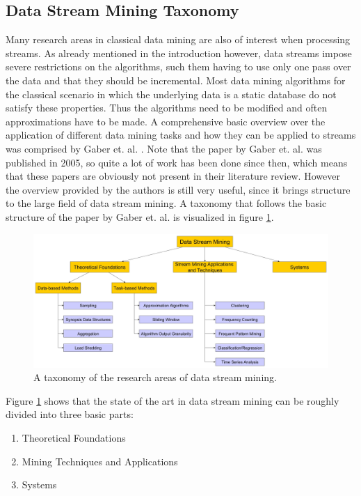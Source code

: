 \subsection{Data Stream Mining Taxonomy}
\label{subsec_dataStreamMiningTaxonomy}
Many research areas in classical data mining are also of interest when processing streams. As already mentioned in the introduction however, data streams impose severe restrictions on the algorithms, such them having to use only one pass over the data and that they should be incremental. Most data mining algorithms for the classical scenario in which the underlying data is a static database do not satisfy these properties. Thus the algorithms need to be modified and often approximations have to be made. A comprehensive basic overview over the application of different data mining tasks and how they can be applied to streams was comprised by Gaber et. al. \cite{gaber2005mining}. Note that the paper by Gaber et. al. was published in 2005, so quite a lot of work has been done since then, which means that these papers are obviously not present in their literature review. However the overview provided by the authors is still very useful, since it brings structure to the large field of data stream mining. A taxonomy that follows the basic structure of the paper by Gaber et. al. is visualized in figure \ref{fig_streamMiningTaxonomy}.

\begin{figure}[h]
	\centering
  	\includegraphics[width=\textwidth]{streamMiningTaxonomy}
	\caption{A taxonomy of the research areas of data stream mining.}
	\label{fig_streamMiningTaxonomy}
\end{figure}

Figure \ref{fig_streamMiningTaxonomy} shows that the state of the art in data stream mining can be roughly divided into three basic parts:

\begin{enumerate}
	\item Theoretical Foundations
	\item Mining Techniques and Applications
	\item Systems
\end{enumerate}

